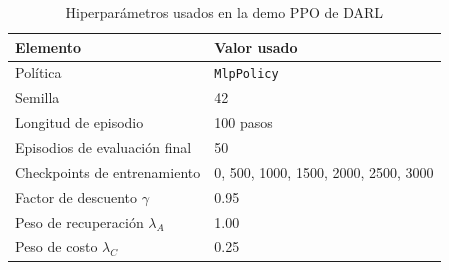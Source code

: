 \begin{table}[H]
    \centering
    \caption{Hiperparámetros usados en la demo PPO de DARL}
    \label{tab:hiperparametros_ppo_demo}
    \begin{tabular}{ll}
        \toprule
        \textbf{Elemento}                & \textbf{Valor usado}                 \\
        \midrule
        Política                         & \texttt{MlpPolicy}                   \\
        Semilla                          & 42                                   \\
        Longitud de episodio             & 100 pasos                            \\
        Episodios de evaluación final    & 50                                   \\
        Checkpoints de entrenamiento     & 0, 500, 1000, 1500, 2000, 2500, 3000 \\
        Factor de descuento $\gamma$     & 0.95                                 \\
        Peso de recuperación $\lambda_A$ & 1.00                                 \\
        Peso de costo $\lambda_C$        & 0.25                                 \\
        \bottomrule
    \end{tabular}
\end{table}
